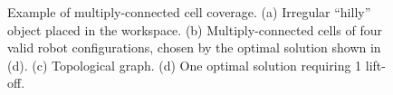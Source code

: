\documentclass[Afour,sageh,times]{sagej}
\begin{document}
\begin{figure}[t]
\centering
{}
\caption{Example of multiply-connected cell coverage. (a) Irregular ``hilly'' object placed in the workspace. 
(b) Multiply-connected cells of four valid robot configurations, chosen by the optimal solution shown in (d). 
(c) Topological graph. (d) One optimal solution requiring 1 lift-off.}
\label{fig:hill_multiply_conn}
\end{figure}
\end{document}

